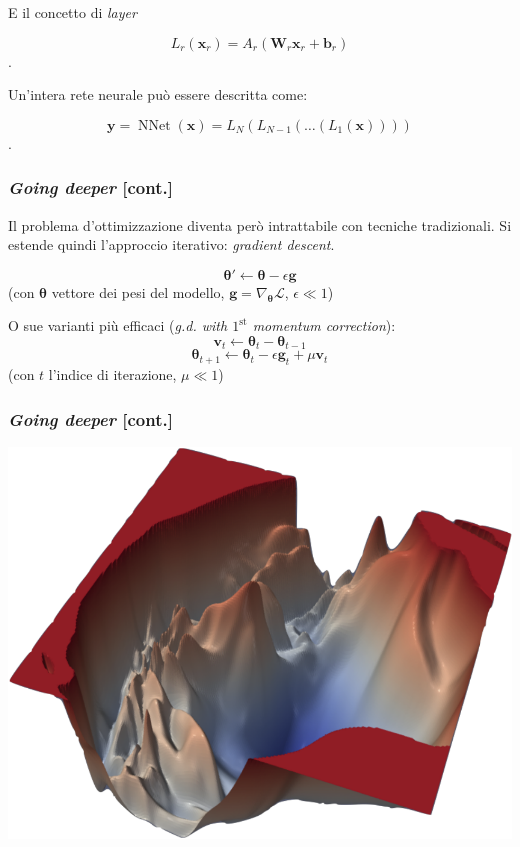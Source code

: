\documentclass{beamer}
\DeclareMathOperator*{\NNet}{NNet}
\begin{document}
{\begin{frame}
	\hfill\break

	E il concetto di \alert{\textit{layer}}

	$$
	L_r(\boldsymbol{x}_r) = A_r\left(  \boldsymbol{W}_r \boldsymbol{x}_r + \boldsymbol{b}_r \right)
	$$.

	\hfill\break

	Un'intera rete neurale può essere descritta come:

	$$
	\boldsymbol{y} = \NNet(\boldsymbol{x}) = L_N( L_{N-1}(\dots (L_1(\boldsymbol{x}))) )
	$$.

\end{frame}


\begin{frame}
	\frametitle{\textit{Going deeper} [cont.]}
	Il problema d'ottimizzazione diventa però \alert{intrattabile} con tecniche tradizionali. Si estende quindi l'approccio iterativo: \textit{gradient descent}.

	$$
	\boldsymbol{\theta'} \leftarrow \boldsymbol{\theta} - \epsilon \boldsymbol{g}
	$$
	(con $\boldsymbol{\theta}$ vettore dei pesi del modello, $\boldsymbol{g} = \nabla_{\boldsymbol{\theta}}\mathcal{L}$, $\epsilon \ll 1$)

	\hfill\break

	O sue varianti più efficaci (\textit{g.d. with $1^{\text{st}}$ momentum correction}):
	$$
	\boldsymbol{v}_t \leftarrow \boldsymbol{\theta}_t - \boldsymbol{\theta}_{t-1}
	$$
	$$
	\boldsymbol{\theta}_{t+1} \leftarrow \boldsymbol{\theta}_{t} - \epsilon \boldsymbol{g}_{t} + \mu \boldsymbol{v}_t
	$$
	(con $t$ l'indice di iterazione, $\mu \ll 1$)
\end{frame}


\begin{frame}
	\frametitle{\textit{Going deeper} [cont.]}
	\center \includegraphics[width=0.8\linewidth]{loss-landscape.png}
\end{frame}

}
\end{document}
